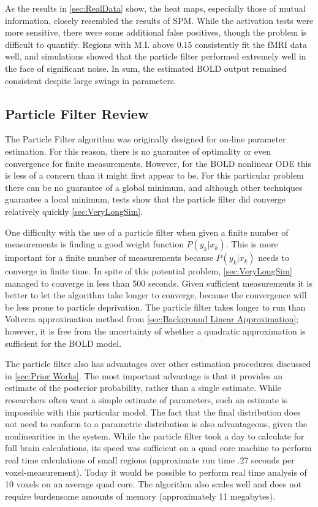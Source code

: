 As the results in \autoref{sec:RealData} show, the heat maps, especially
those of mutual information, closely resembled the results of \ac{SPM}. While the activation
tests were more sensitive, there were some additional false positives,
though the problem is difficult to quantify. Regions with M.I. above
$0.15$ consistently fit the \ac{fMRI} data well, and simulations showed that
the particle filter performed extremely well in the face of significant
noise. In sum, the estimated \ac{BOLD} output remained consistent despite
large swings in parameters.

\subsection{Particle Filter Review}
The Particle Filter algorithm was originally designed for on-line parameter
estimation. For this reason, there is no guarantee of optimality or even
convergence for finite measurements. However, for the \ac{BOLD} nonlinear \ac{ODE}
this is less of a concern than it might first appear to be. For this
particular problem there can be no guarantee of a global minimum, and although
other techniques guarantee a local minimum, tests show that the particle
filter did converge relatively quickly \autoref{sec:VeryLongSim}.

One difficulty
with the use of a particle filter when given a finite number of measurements is finding
a good weight function $P(y_k | x_k)$. This is more important for a finite
number of measurements because $P(y_k | x_k)$ needs to converge in finite time.
In spite of this potential problem, \autoref{sec:VeryLongSim} managed
to converge in less than 500 seconds.  Given sufficient
measurements it is better to let the algorithm take longer to converge, because the
convergence will be less prone to particle deprivation. The particle filter takes longer
to run than Volterra approximation method from \autoref{sec:Background Linear Approximation};
however, it is free from the uncertainty of whether a quadratic approximation is
sufficient for the \ac{BOLD} model.

The particle filter also has advantages over other estimation procedures
discussed in \autoref{sec:Prior Works}. The most important advantage is that it provides
an estimate of the posterior probability, rather than a single estimate. While researchers
often want a simple estimate of parameters, such an estimate is impossible with this particular
model. The fact that the final distribution does not need to conform to a
parametric distribution is also advantageous, given the nonlinearities in the system.
While the particle filter took a day to calculate for full brain calculations, its speed
was sufficient on a quad core machine to perform real time calculations of small regions
(approximate run time .27 seconds per voxel-measurement). Today it would be possible
 to perform real time analysis of 10 voxels on an average quad core. The algorithm also scales
well and does not require burdensome amounts of memory (approximately 11 megabytes).

